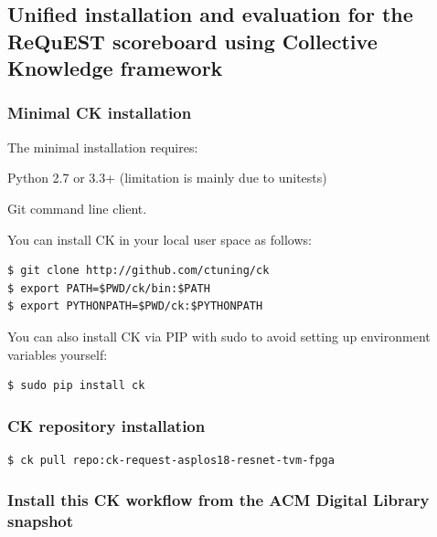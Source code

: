 \documentclass[sigconf]{acmart}
\newenvironment{packed_itemize}{
\begin{itemize}
  \setlength{\itemsep}{1pt}
  \setlength{\parskip}{0pt}
  \setlength{\parsep}{0pt}
}{\end{itemize}}
\begin{document}

\subsection{Unified installation and evaluation for the ReQuEST scoreboard using Collective Knowledge framework}

\subsubsection{Minimal CK installation}

The minimal installation requires:

\begin{packed_itemize}
 \item Python 2.7 or 3.3+ (limitation is mainly due to unitests)
 \item Git command line client.
\end{packed_itemize}

You can install CK in your local user space as follows:

\begin{verbatim}
$ git clone http://github.com/ctuning/ck
$ export PATH=$PWD/ck/bin:$PATH
$ export PYTHONPATH=$PWD/ck:$PYTHONPATH
\end{verbatim}

You can also install CK via PIP with sudo to avoid setting up environment variables yourself:

\begin{verbatim}
$ sudo pip install ck
\end{verbatim}

\subsubsection{CK repository installation}

\begin{verbatim}
$ ck pull repo:ck-request-asplos18-resnet-tvm-fpga
\end{verbatim}

\subsubsection{Install this CK workflow from the ACM Digital Library snapshot}
\end{document}
